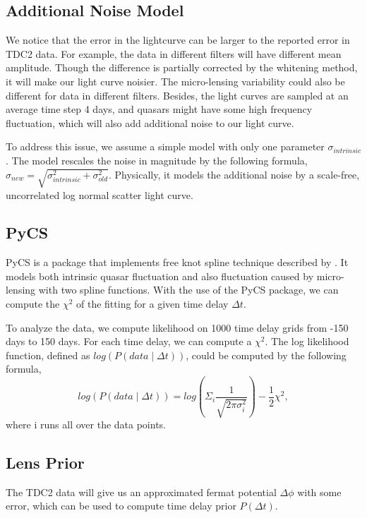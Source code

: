 \documentclass[\docopts]{\docclass}
\begin{document}
\subsection{Additional Noise Model}
We notice that the error in the lightcurve can be larger to the reported error in TDC2 data. For example, the data in different filters will have different mean amplitude. Though the difference is partially corrected by the whitening method, it will make our light curve noisier. The micro-lensing variability could also be different for data in different filters. Besides, the light curves are sampled at an average time step 4 days, and quasars might have some high frequency fluctuation, which will also add additional noise to our light curve. 

To address this issue, we assume a simple model with only one parameter $\sigma_{intrinsic}$. The model rescales the noise in magnitude by the following formula, $\sigma_{new}=\sqrt{\sigma_{intrinsic}^2+\sigma_{old}^2}$.  Physically, it models the additional noise by a scale-free, uncorrelated log normal scatter light curve. 

\subsection{PyCS}
PyCS is a package that implements free knot spline technique described by \cite{2013A&A...553A.120T}. It models both intrinsic quasar fluctuation and also fluctuation caused by micro-lensing with two spline functions. With the use of the PyCS package, we can compute the $\chi^2$ of the fitting for a given time delay $\Delta t$. 

To analyze the data, we compute likelihood on 1000 time delay grids from -150 days to 150 days.  For each time delay, we can compute a $\chi^2$. The log likelihood function, defined as $log(P(data \mid \Delta t))$, could be computed by the following formula,
\begin{equation}
log(P(data \mid \Delta t))  = log (\Sigma_i  \frac{1}{\sqrt{2 \pi \sigma_i^2}} ) -\frac{1}{2} \chi^2,
\end{equation}
where i runs all over the data points. 

\subsection{Lens Prior}
The TDC2 data will give us an approximated fermat potential $\Delta \phi$ with some error, which can be used to compute time delay prior $P(\Delta t)$.
\end{document}
